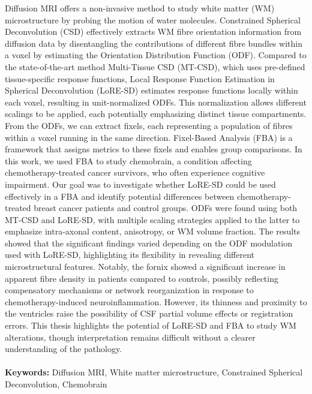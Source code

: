 \documentclass{Configuration_Files/PoliMi3i_thesis}
\begin{document}
Diffusion MRI offers a non-invasive method to study white matter (WM) microstructure by probing the motion of water molecules. Constrained Spherical Deconvolution (CSD) effectively extracts WM fibre orientation information from diffusion data by disentangling the contributions of different fibre bundles within a voxel by estimating the Orientation Distribution Function (ODF). Compared to the state-of-the-art method Multi-Tissue CSD (MT-CSD), which uses pre-defined tissue-specific response functions, Local Response Function Estimation in Spherical Deconvolution (LoRE-SD) estimates response functions locally within each voxel, resulting in unit-normalized ODFs. This normalization allows different scalings to be applied, each potentially emphasizing distinct tissue compartments. 
From the ODFs, we can extract fixels, each representing a population of fibres within a voxel running in the same direction. Fixel-Based Analysis (FBA) is a framework that assigns metrics to these fixels and enables group comparisons.
In this work, we used FBA to study chemobrain, a condition affecting chemotherapy-treated cancer survivors, who often experience cognitive impairment. Our goal was to investigate whether LoRE-SD could be used effectively in a FBA and identify potential differences between chemotherapy-treated breast cancer patients and control groups. ODFs were found using both MT-CSD and LoRE-SD, with multiple scaling strategies applied to the latter to emphasize intra-axonal content, anisotropy, or WM volume fraction. The results showed that the significant findings varied depending on the ODF modulation used with LoRE-SD, highlighting its flexibility in revealing different microstructural features. Notably, the fornix showed a significant increase in apparent fibre density in patients compared to controls, possibly reflecting compensatory mechanisms or network reorganization in response to chemotherapy-induced neuroinflammation. However, its thinness and proximity to the ventricles raise the possibility of CSF partial volume effects or registration errors. This thesis highlights the potential of LoRE-SD and FBA to study WM alterations, though interpretation remains difficult without a clearer understanding of the pathology.
\\
\\
\textbf{Keywords:} Diffusion MRI, White matter microstructure, Constrained Spherical Deconvolution, Chemobrain %

\end{document}
